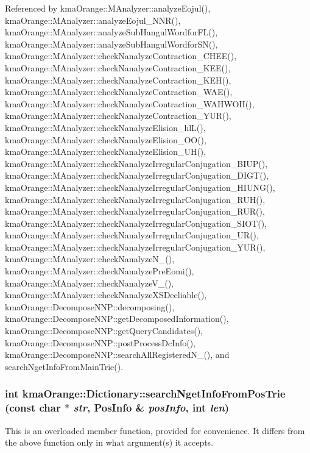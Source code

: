 Referenced by kmaOrange::MAnalyzer::analyzeEojul(), kmaOrange::MAnalyzer::analyzeEojul\_\-NNR(), kmaOrange::MAnalyzer::analyzeSubHangulWordforFL(), kmaOrange::MAnalyzer::analyzeSubHangulWordforSN(), kmaOrange::MAnalyzer::checkNanalyzeContraction\_\-CHEE(), kmaOrange::MAnalyzer::checkNanalyzeContraction\_\-KEE(), kmaOrange::MAnalyzer::checkNanalyzeContraction\_\-KEH(), kmaOrange::MAnalyzer::checkNanalyzeContraction\_\-WAE(), kmaOrange::MAnalyzer::checkNanalyzeContraction\_\-WAHWOH(), kmaOrange::MAnalyzer::checkNanalyzeContraction\_\-YUR(), kmaOrange::MAnalyzer::checkNanalyzeElision\_\-hlL(), kmaOrange::MAnalyzer::checkNanalyzeElision\_\-OO(), kmaOrange::MAnalyzer::checkNanalyzeElision\_\-UH(), kmaOrange::MAnalyzer::checkNanalyzeIrregularConjugation\_\-BIUP(), kmaOrange::MAnalyzer::checkNanalyzeIrregularConjugation\_\-DIGT(), kmaOrange::MAnalyzer::checkNanalyzeIrregularConjugation\_\-HIUNG(), kmaOrange::MAnalyzer::checkNanalyzeIrregularConjugation\_\-RUH(), kmaOrange::MAnalyzer::checkNanalyzeIrregularConjugation\_\-RUR(), kmaOrange::MAnalyzer::checkNanalyzeIrregularConjugation\_\-SIOT(), kmaOrange::MAnalyzer::checkNanalyzeIrregularConjugation\_\-UR(), kmaOrange::MAnalyzer::checkNanalyzeIrregularConjugation\_\-YUR(), kmaOrange::MAnalyzer::checkNanalyzeN\_\-(), kmaOrange::MAnalyzer::checkNanalyzePreEomi(), kmaOrange::MAnalyzer::checkNanalyzeV\_\-(), kmaOrange::MAnalyzer::checkNanalyzeXSDecliable(), kmaOrange::DecomposeNNP::decomposing(), kmaOrange::DecomposeNNP::getDecomposedInformation(), kmaOrange::DecomposeNNP::getQueryCandidates(), kmaOrange::DecomposeNNP::postProcessDcInfo(), kmaOrange::DecomposeNNP::searchAllRegisteredN\_\-(), and searchNgetInfoFromMainTrie().\hypertarget{classkmaOrange_1_1Dictionary_d95dd9fbf856d49cfd84a1c081f37959}{
\subsubsection[{searchNgetInfoFromPosTrie}]{\setlength{\rightskip}{0pt plus 5cm}int kmaOrange::Dictionary::searchNgetInfoFromPosTrie (const char $\ast$ {\em str}, \/  {\bf PosInfo} \& {\em posInfo}, \/  int {\em len})}}
\label{classkmaOrange_1_1Dictionary_d95dd9fbf856d49cfd84a1c081f37959}


This is an overloaded member function, provided for convenience. It differs from the above function only in what argument(s) it accepts. 

